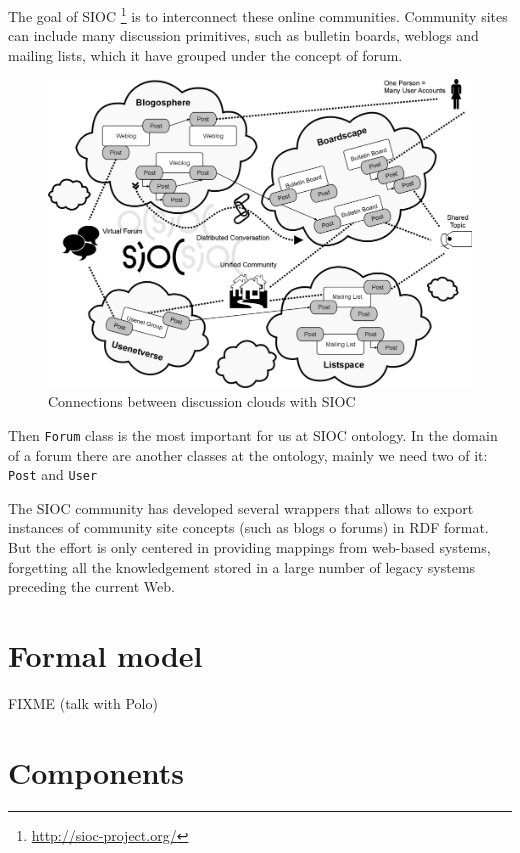 \documentclass{llncs}
\begin{document}
The goal of SIOC \footnote{\url{http://sioc-project.org/}} is to interconnect
these online communities. Community sites can include many discussion primitives,
such as bulletin boards, weblogs and mailing lists, which it have grouped under 
the concept of forum.

\begin{figure}[ht]
 \centering
 \includegraphics[bb=0 0 240 174]{images/sioc-discussion.png}
 \caption{Connections between discussion clouds with SIOC}
\end{figure}

Then \texttt{Forum} class is the most important for us at SIOC ontology. In the 
domain of a forum there are another classes at the ontology, mainly we need two
of it: \texttt{Post} and \texttt{User} 

The SIOC community has developed several wrappers that allows to export instances
of community site concepts (such as blogs o forums) in RDF format. But the effort 
is only centered in providing mappings from web-based systems, forgetting all the 
knowledgement stored in a large number of legacy systems preceding the current Web.

\section{Formal model}

FIXME (talk with Polo)

\section{Components}
\end{document}
